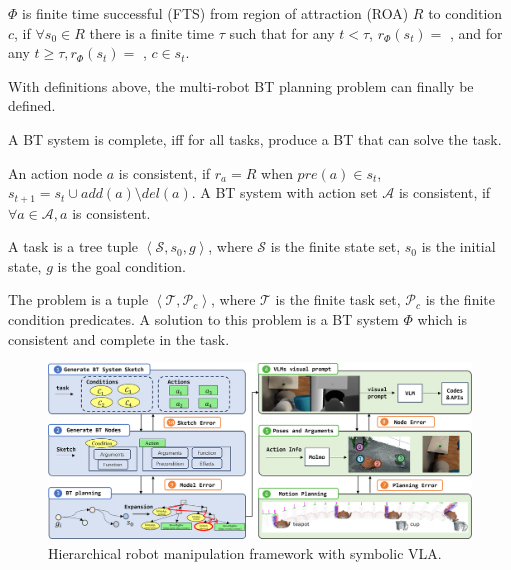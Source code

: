 \documentclass{article}
\begin{document}
\begin{definition}
$\Phi$ is finite time successful (FTS) from region of attraction (ROA) $R$ to condition $c$, if $\forall s_0 \in R$  there is 
 a finite time $\tau$ such that for any $t<\tau$, $r_\Phi(s_t)=$ , and for any $t\geq\tau, r_\Phi(s_t)=$ , $c\in s_t$.
\end{definition}
With definitions above, the multi-robot BT planning problem can finally be defined.

\begin{definition}[Completeness]
A BT system is complete, iff for all tasks, produce a BT that can solve the task.
\end{definition}

\begin{definition}[Consistency]
An action node $a$ is consistent, if $r_{a}=R$ when $pre(a) \in s_t$, $s_{t+1}=s_t\cup add(a) \setminus del(a)$. A BT system with action set $\mathcal{A}$ is consistent, if $\forall a\in \mathcal{A}, a$ is consistent.
\end{definition}



\begin{definition}[Task]
A task is a tree tuple $\left<\mathcal{S}, s_0, g\right>$, where $\mathcal{S}$ is the finite state set, $s_0$ is the initial state, $g$ is the goal condition.
\end{definition}



\begin{problem}[BT Grounding]
The problem is a tuple \(\left<\mathcal{T},\mathcal{P}_c\right>\), where \( \mathcal{T} \) is the finite task set, $\mathcal{P}_c$ is the finite condition predicates. A solution to this problem is a BT system $\Phi$ which is consistent and complete in the task.

\end{problem}



\begin{figure}[t]
    \centering
    \includegraphics[width=1\textwidth]{figures/framework}
    \caption{Hierarchical robot manipulation framework with symbolic VLA.}
    \label{fig:symbolic_reasoning}
\end{figure}
\end{document}
